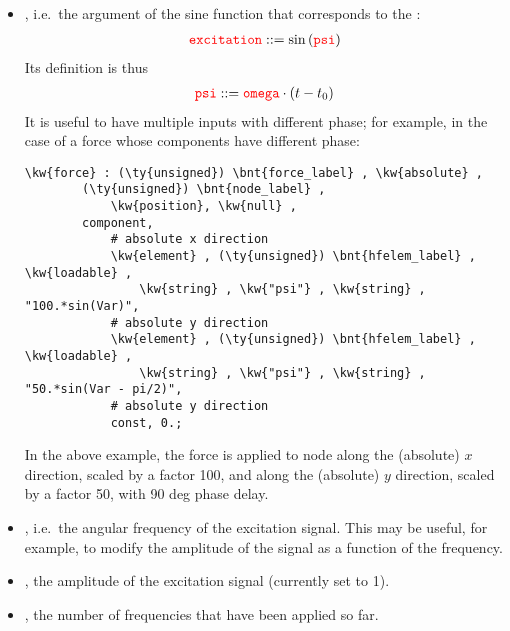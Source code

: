\begin{itemize}
\item {}, i.e.\ the argument of the sine function that corresponds to the :
\begin{align}
	\textcolor{red}{\texttt{excitation}} ::= \sin\left( \textcolor{red}{\texttt{psi}} \right)
\end{align}
Its definition is thus
\begin{align}
	\textcolor{red}{\texttt{psi}} ::= \textcolor{red}{\texttt{omega}} \cdot (t - t_0)
\end{align}
It is useful to have multiple inputs with different phase; for example, in the case of a force whose components have different phase:
\begin{Verbatim}[commandchars=\\\{\}]
    \kw{force} : (\ty{unsigned}) \bnt{force_label} , \kw{absolute} ,
        (\ty{unsigned}) \bnt{node_label} ,
            \kw{position}, \kw{null} ,
        component,
            # absolute x direction
            \kw{element} , (\ty{unsigned}) \bnt{hfelem_label} , \kw{loadable} ,
                \kw{string} , \kw{"psi"} , \kw{string} , "100.*sin(Var)",
            # absolute y direction
            \kw{element} , (\ty{unsigned}) \bnt{hfelem_label} , \kw{loadable} ,
                \kw{string} , \kw{"psi"} , \kw{string} , "50.*sin(Var - pi/2)",
            # absolute y direction
            const, 0.;
\end{Verbatim}
In the above example, the force is applied to node 
along the (absolute) $x$ direction, scaled by a factor 100, and
along the (absolute) $y$ direction, scaled by a factor 50, with 90 deg phase delay.

\item {}, i.e.\ the angular frequency of the excitation signal.
This may be useful, for example, to modify the amplitude of the signal as a function of the frequency.

\item {}, the amplitude of the excitation signal (currently set to 1).

\item {}, the number of frequencies that have been applied so far.

\end{itemize}

